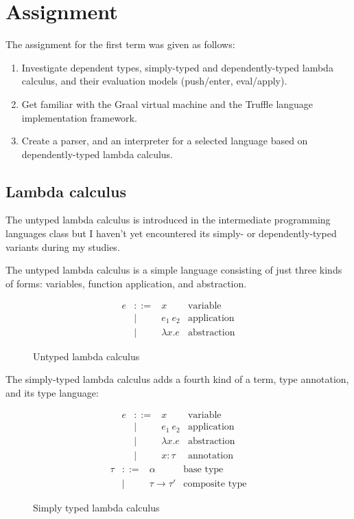 \documentclass{SPFIT}
\begin{document}
\section{Assignment}
\label{sec:org551e1f1}
The assignment for the first term was given as follows:
\begin{enumerate}
\item Investigate dependent types, simply-typed and dependently-typed lambda
calculus, and their evaluation models (push/enter, eval/apply).
\item Get familiar with the Graal virtual machine and the Truffle language
implementation framework.
\item Create a parser, and an interpreter for a selected language based on
dependently-typed lambda calculus.
\end{enumerate}

\subsection{Lambda calculus}
\label{sec:org6b3622c}
The untyped lambda calculus is introduced in the intermediate programming
languages class but I haven't yet encountered its simply- or dependently-typed
variants during my studies.

The untyped lambda calculus is a simple language consisting of just three kinds
of forms: variables, function application, and abstraction.

\begin{figure}[!htpb]
\[\begin{array}{ccll}
e & ::= & x            & \text{variable} \\
  & |   & e_1~e_2      & \text{application} \\
  & |   & \lambda x. e & \text{abstraction}
\end{array}\]
\caption{Untyped lambda calculus}
\end{figure}

The simply-typed lambda calculus adds a fourth kind of a term, type annotation,
and its type language:

\begin{figure}[!htpb]
\[\begin{array}{ccll}
e & ::= & x           & \text{variable} \\
  & |   & e_1~e_2      & \text{application} \\
  & |   & \lambda x. e & \text{abstraction} \\
  & |   & x:\tau     & \text{annotation}
\end{array}\]
\[\begin{array}{ccll}
\tau & ::= & \alpha           & \text{base type} \\
     & |   & \tau\rightarrow\tau' & \text{composite type}
\end{array}\]
\caption{Simply typed lambda calculus}
\end{figure}
\end{document}
